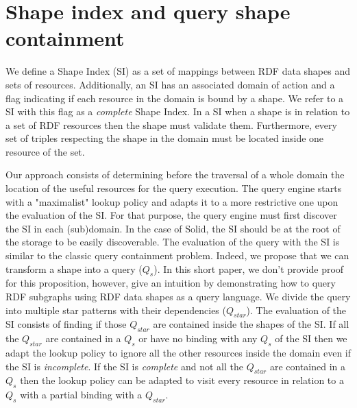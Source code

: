 \section{Shape index and query shape containment}

We define a Shape Index (SI) as a set of mappings between RDF data shapes and sets of resources.
Additionally, an SI has an associated domain of action
and a flag indicating if each resource in the domain is bound by a shape. 
We refer to a SI with this flag as a \emph{complete} Shape Index.
In a SI when a shape is in relation to a set of RDF resources then the shape must validate them.
Furthermore, every set of triples respecting the shape in the domain must be located inside one resource of the set.

Our approach consists of determining before the traversal of a whole domain the location of the useful resources for the query execution.
The query engine starts with a "maximalist" lookup policy and adapts it to a more restrictive one upon the evaluation of the SI.
For that purpose, the query engine must first discover the SI in each (sub)domain.
In the case of Solid, the SI should be at the root of the storage to be easily discoverable.
The evaluation of the query with the SI is similar to the classic query containment problem.
Indeed, we propose that we can transform a shape into a query ($Q_{s}$).
In this short paper, we don't provide proof for this proposition, however, 
\citeauthor{Delva2021} give an intuition by demonstrating how to query RDF subgraphs using RDF data shapes as a query language.
We divide the query into multiple star patterns with their dependencies ($Q_{star}$).
The evaluation of the SI consists of finding if those $Q_{star}$ are contained inside the shapes of the SI.
If all the $Q_{star}$ are contained in a $Q_{s}$ or have no binding with any $Q_{s}$ of the SI
then we adapt the lookup policy to ignore all the other resources inside the domain even if the SI is \emph{incomplete}.
If the SI is \emph{complete} and not all the $Q_{star}$ are contained in a $Q_{s}$ then the lookup policy can be adapted
to visit every resource in relation to a $Q_{s}$ with a partial binding with a $Q_{star}$.
